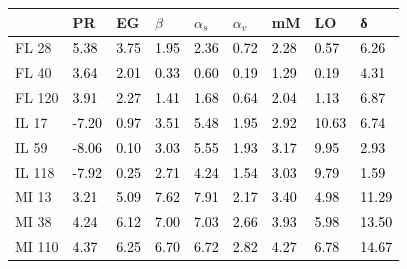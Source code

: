 \begin{tabular}{lllllllll}
\toprule
 & PR & EG & $β$ & $α_s$ & $α_v$ & mM & LO & δ \\
\midrule
FL 28 & \textcolor{black}{ 5.38 } & \textcolor{black}{ 3.75 } & \textcolor{black}{ 1.95 } & \textcolor{black}{ 2.36 } & \textcolor{black}{ 0.72 } & \textcolor{black}{ 2.28 } & \textcolor{black}{ 0.57 } & \textcolor{black}{ 6.26 } \\
FL 40 & \textcolor{black}{ 3.64 } & \textcolor{black}{ 2.01 } & \textcolor{black}{ 0.33 } & \textcolor{black}{ 0.60 } & \textcolor{black}{ 0.19 } & \textcolor{black}{ 1.29 } & \textcolor{black}{ 0.19 } & \textcolor{black}{ 4.31 } \\
FL 120 & \textcolor{black}{ 3.91 } & \textcolor{black}{ 2.27 } & \textcolor{black}{ 1.41 } & \textcolor{black}{ 1.68 } & \textcolor{black}{ 0.64 } & \textcolor{black}{ 2.04 } & \textcolor{black}{ 1.13 } & \textcolor{black}{ 6.87 } \\
IL 17 & \textcolor{black}{ -7.20 } & \textcolor{black}{ 0.97 } & \textcolor{black}{ 3.51 } & \textcolor{black}{ 5.48 } & \textcolor{black}{ 1.95 } & \textcolor{black}{ 2.92 } & \textcolor{black}{ 10.63 } & \textcolor{black}{ 6.74 } \\
IL 59 & \textcolor{black}{ -8.06 } & \textcolor{black}{ 0.10 } & \textcolor{black}{ 3.03 } & \textcolor{black}{ 5.55 } & \textcolor{black}{ 1.93 } & \textcolor{black}{ 3.17 } & \textcolor{black}{ 9.95 } & \textcolor{black}{ 2.93 } \\
IL 118 & \textcolor{black}{ -7.92 } & \textcolor{black}{ 0.25 } & \textcolor{black}{ 2.71 } & \textcolor{black}{ 4.24 } & \textcolor{black}{ 1.54 } & \textcolor{black}{ 3.03 } & \textcolor{black}{ 9.79 } & \textcolor{black}{ 1.59 } \\
MI 13 & \textcolor{black}{ 3.21 } & \textcolor{black}{ 5.09 } & \textcolor{black}{ 7.62 } & \textcolor{black}{ 7.91 } & \textcolor{black}{ 2.17 } & \textcolor{black}{ 3.40 } & \textcolor{black}{ 4.98 } & \textcolor{black}{ 11.29 } \\
MI 38 & \textcolor{black}{ 4.24 } & \textcolor{black}{ 6.12 } & \textcolor{black}{ 7.00 } & \textcolor{black}{ 7.03 } & \textcolor{black}{ 2.66 } & \textcolor{black}{ 3.93 } & \textcolor{black}{ 5.98 } & \textcolor{black}{ 13.50 } \\
MI 110 & \textcolor{black}{ 4.37 } & \textcolor{black}{ 6.25 } & \textcolor{black}{ 6.70 } & \textcolor{black}{ 6.72 } & \textcolor{black}{ 2.82 } & \textcolor{black}{ 4.27 } & \textcolor{black}{ 6.78 } & \textcolor{black}{ 14.67 } \\

\end{tabular}
